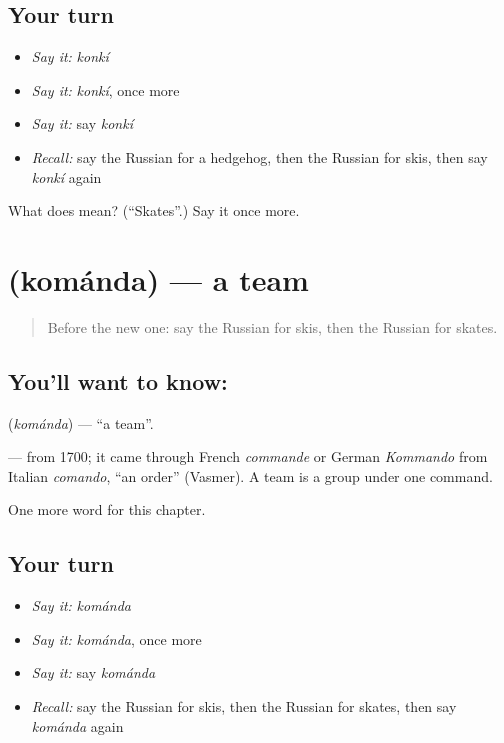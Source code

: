 \subsection*{Your turn}
\begin{itemize}
\raggedright
  \item \emph{Say it:} \emph{konkí}
  \item \emph{Say it:} \emph{konkí}, once more
  \item \emph{Say it:} say \emph{konkí}
  \item \emph{Recall:} say the Russian for a hedgehog, then the Russian for skis, then say \emph{konkí} again
\end{itemize}

\begin{tcolorbox}[breakable,colback=teal!4,colframe=teal!35!black,title={Before you move on}]
What does  mean? (\textquotedblleft{}Skates\textquotedblright{}.) Say it once more.
\end{tcolorbox}
\section[\texorpdfstring{\ru{команда} (kománda)}{команда (kománda)}]{ (kománda) — a team}

\label{lesson:RU-C166-komanda}



\begin{quote}
Before the new one: say the Russian for skis, then the Russian for skates.
\end{quote}

\subsection*{You'll want to know: }
\textbf{} (\emph{kománda}) — \textquotedblleft{}a team\textquotedblright{}.

\begin{cousinweb}
\textbf{} — from 1700; it came through French \emph{commande} or German \emph{Kommando} from Italian \emph{comando}, \textquotedblleft{}an order\textquotedblright{} (Vasmer). A team is a group under one command.
\end{cousinweb}

\begin{grammarlens}[title={What you've built}]
One more word for this chapter.
\end{grammarlens}

\subsection*{Your turn}
\begin{itemize}
\raggedright
  \item \emph{Say it:} \emph{kománda}
  \item \emph{Say it:} \emph{kománda}, once more
  \item \emph{Say it:} say \emph{kománda}
  \item \emph{Recall:} say the Russian for skis, then the Russian for skates, then say \emph{kománda} again
\end{itemize}

